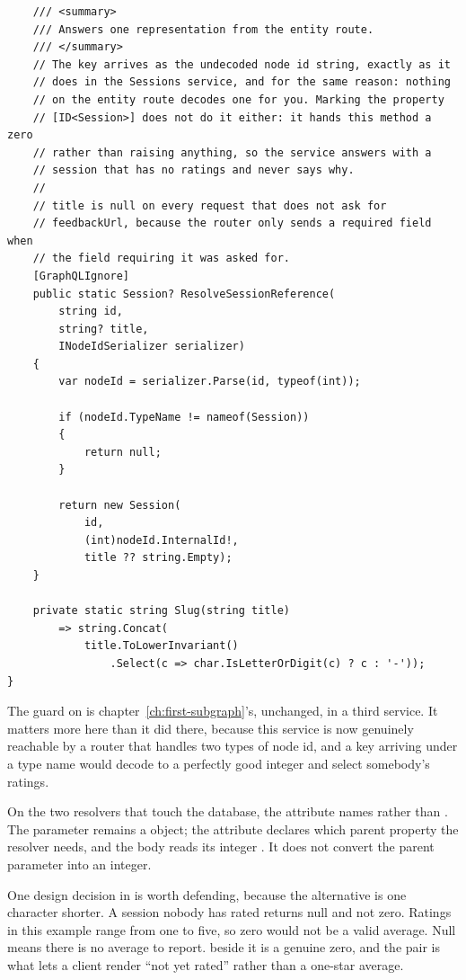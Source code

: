 \begin{verbatim}
    /// <summary>
    /// Answers one representation from the entity route.
    /// </summary>
    // The key arrives as the undecoded node id string, exactly as it
    // does in the Sessions service, and for the same reason: nothing
    // on the entity route decodes one for you. Marking the property
    // [ID<Session>] does not do it either: it hands this method a zero
    // rather than raising anything, so the service answers with a
    // session that has no ratings and never says why.
    //
    // title is null on every request that does not ask for
    // feedbackUrl, because the router only sends a required field when
    // the field requiring it was asked for.
    [GraphQLIgnore]
    public static Session? ResolveSessionReference(
        string id,
        string? title,
        INodeIdSerializer serializer)
    {
        var nodeId = serializer.Parse(id, typeof(int));

        if (nodeId.TypeName != nameof(Session))
        {
            return null;
        }

        return new Session(
            id,
            (int)nodeId.InternalId!,
            title ?? string.Empty);
    }

    private static string Slug(string title)
        => string.Concat(
            title.ToLowerInvariant()
                .Select(c => char.IsLetterOrDigit(c) ? c : '-'));
}
\end{verbatim}

%
The guard on  is chapter~\ref{ch:first-subgraph}'s,
unchanged, in a third service. It matters more here than it did there, because
this service is now genuinely reachable by a router that handles two types of
node id, and a  key arriving under a  type name
would decode to a perfectly good integer and select somebody's ratings.

%
On the two resolvers that touch the database, the \code{[Parent]} attribute
names  rather than . The parameter remains a
 object; the attribute declares which parent property the
resolver needs, and the body reads its integer . It does not
convert the parent parameter into an integer.

%
One design decision in  is worth defending, because
the alternative is one character shorter. A session nobody has rated returns
null and not zero. Ratings in this example range from one to five, so zero
would not be a valid average. Null means there is no average to report.
 beside it is a genuine zero, and the pair is what
lets a client render \enquote{not yet rated} rather than a one-star average.

